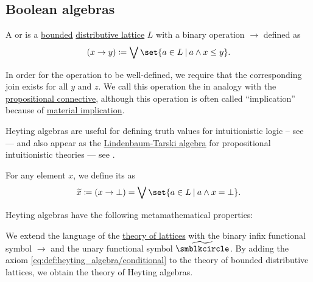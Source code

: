 \subsection{Boolean algebras}\label{subsec:boolean_algebras}

\begin{definition}\label{def:heyting_algebra}
  A  or  is a \hyperref[def:semilattice/bounded]{bounded} \hyperref[def:semilattice/distributive_lattice]{distributive lattice} \( L \) with a binary operation \( \rightarrow \) defined as
  \begin{equation}\label{eq:def:heyting_algebra/conditional}
    (x \rightarrow y) \coloneqq \bigvee\set{ a \in L \given a \wedge x \leq y }.
  \end{equation}

  In order for the operation to be well-defined, we require that the corresponding join exists for all \( y \) and \( z \). We call this operation the  in analogy with the \hyperref[def:propositional_language/connectives/conditional]{propositional connective}, although this operation is often called \enquote{implication} because of \hyperref[def:material_implication]{material implication}.

  Heyting algebras are useful for defining truth values for intuitionistic logic -- see  --- and also appear as the \hyperref[def:lindenbaum_tarski_algebra]{Lindenbaum-Tarski algebra} for propositional intuitionistic theories --- see .

  \begin{thmenum}[series=def:heyting_algebra]
     For any element \( x \), we define its  as
    \begin{equation}\label{eq:def:heyting_algebra/pseudocomplement}
      \widetilde x
      \coloneqq
      (x \rightarrow \bot)
      =
      \bigvee\set{ a \in L \given a \wedge x = \bot }.
    \end{equation}
  \end{thmenum}

  Heyting algebras have the following metamathematical properties:
  \begin{thmenum}[resume=def:heyting_algebra]
     We extend the language of the \hyperref[def:semilattice/theory]{theory of lattices} with the binary infix functional symbol \( \rightarrow \) and the unary functional symbol \( \widetilde{\anon} \). By adding the axiom \eqref{eq:def:heyting_algebra/conditional} to the theory of bounded distributive lattices, we obtain the theory of Heyting algebras.


\end{thmenum}
\end{definition}
